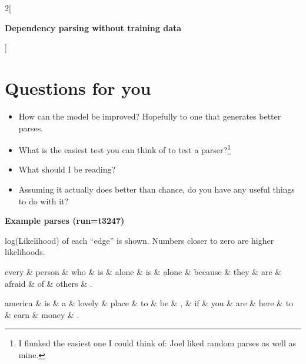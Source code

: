 \documentclass[12pt]{extarticle}
\begin{document}
\begin{multicols*}{2}[
\centerline{\Huge\bf Dependency parsing without training data}
\vspace{2ex}
]
\section*{Questions for you}
\begin{itemize}
\item How can the model be improved?  Hopefully to one that generates
better parses.
\item What is the easiest test you can think of to test a parser?\footnote{I
flunked the easiest one I could think of: Joel liked random parses as
well as mine.}
\item What should I be reading?
\item Assuming it actually does better than chance, do you have any
useful things to do with it?
\end{itemize}

\end{multicols*}



\cleardoublepage
\centerline{\Huge\bf Example parses (run=t3247)}

\vfill

\centerline{log(Likelihood) of each ``edge'' is shown.  Numbers closer to zero are
higher likelihoods.}

\vfill

\begin{dependency}[theme = simple]
\begin{deptext}[column sep=1em]
     every \& person \& who \& is \& alone \& is \& alone \& because \& they \& are \& afraid \& of \& others \& .  \\
\end{deptext}
\end{dependency}

\begin{dependency}[theme = simple]
\begin{deptext}[column sep=1em]
     america \& is \& a \& lovely \& place \& to \& be \& , \& if \& you \& are \& here \& to \& earn \& money \& .  \\
\end{deptext}
\end{dependency}
\end{document}

